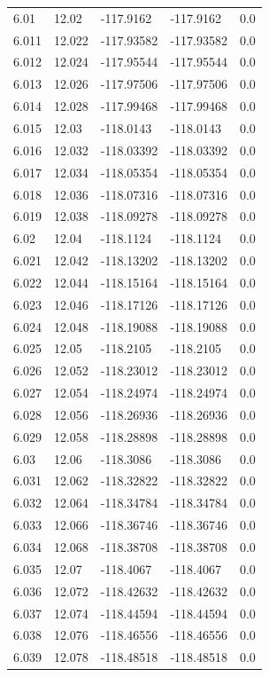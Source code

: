 \begin{tabular}{lllll}
6.01 & 12.02 & -117.9162 & -117.9162 & 0.0 \\
6.011 & 12.022 & -117.93582 & -117.93582 & 0.0 \\
6.012 & 12.024 & -117.95544 & -117.95544 & 0.0 \\
6.013 & 12.026 & -117.97506 & -117.97506 & 0.0 \\
6.014 & 12.028 & -117.99468 & -117.99468 & 0.0 \\
6.015 & 12.03 & -118.0143 & -118.0143 & 0.0 \\
6.016 & 12.032 & -118.03392 & -118.03392 & 0.0 \\
6.017 & 12.034 & -118.05354 & -118.05354 & 0.0 \\
6.018 & 12.036 & -118.07316 & -118.07316 & 0.0 \\
6.019 & 12.038 & -118.09278 & -118.09278 & 0.0 \\
6.02 & 12.04 & -118.1124 & -118.1124 & 0.0 \\
6.021 & 12.042 & -118.13202 & -118.13202 & 0.0 \\
6.022 & 12.044 & -118.15164 & -118.15164 & 0.0 \\
6.023 & 12.046 & -118.17126 & -118.17126 & 0.0 \\
6.024 & 12.048 & -118.19088 & -118.19088 & 0.0 \\
6.025 & 12.05 & -118.2105 & -118.2105 & 0.0 \\
6.026 & 12.052 & -118.23012 & -118.23012 & 0.0 \\
6.027 & 12.054 & -118.24974 & -118.24974 & 0.0 \\
6.028 & 12.056 & -118.26936 & -118.26936 & 0.0 \\
6.029 & 12.058 & -118.28898 & -118.28898 & 0.0 \\
6.03 & 12.06 & -118.3086 & -118.3086 & 0.0 \\
6.031 & 12.062 & -118.32822 & -118.32822 & 0.0 \\
6.032 & 12.064 & -118.34784 & -118.34784 & 0.0 \\
6.033 & 12.066 & -118.36746 & -118.36746 & 0.0 \\
6.034 & 12.068 & -118.38708 & -118.38708 & 0.0 \\
6.035 & 12.07 & -118.4067 & -118.4067 & 0.0 \\
6.036 & 12.072 & -118.42632 & -118.42632 & 0.0 \\
6.037 & 12.074 & -118.44594 & -118.44594 & 0.0 \\
6.038 & 12.076 & -118.46556 & -118.46556 & 0.0 \\
6.039 & 12.078 & -118.48518 & -118.48518 & 0.0 \\

\end{tabular}
